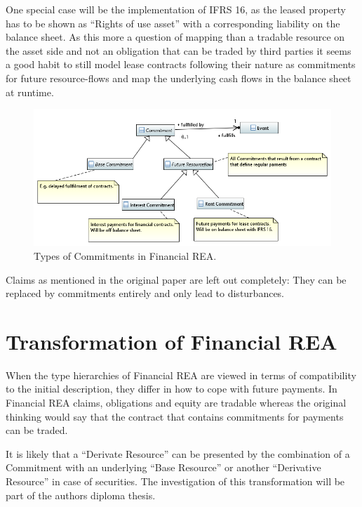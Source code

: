 \documentclass[10pt,paper=a4,parskip]{scrartcl}
\begin{document}
One special case will be the implementation of IFRS 16, as the leased property has to be shown as ``Rights of use asset'' with a corresponding liability  on the balance sheet.
As this more a question of mapping than a tradable resource on the asset side and not an obligation that can be traded by third parties it seems a good habit to still model lease contracts following their nature as commitments for future resource-flows and map the underlying cash flows in the balance sheet at runtime.

\begin{figure}
\centering
\includegraphics[width=0.8\linewidth]{"Financial REA EventsCommitments"}
\caption{Types of Commitments in Financial REA.}
\label{fig:financial-rea-eventscommitments}
\end{figure}


Claims as mentioned in the original paper are left out completely: They can be replaced by commitments entirely and only lead to disturbances.

\section{Transformation of Financial REA}

When the type hierarchies of Financial REA are viewed in terms of compatibility to the initial description, they differ in how to cope with future payments.
In Financial REA claims, obligations and equity are tradable whereas the original thinking would say that the contract that contains commitments for payments can be traded.

It is likely that a ``Derivate Resource'' can be presented by the combination of a Commitment with an underlying ``Base Resource'' or another ``Derivative Resource'' in case of securities.
The investigation of this transformation will be part of the authors diploma thesis.



\end{document}
